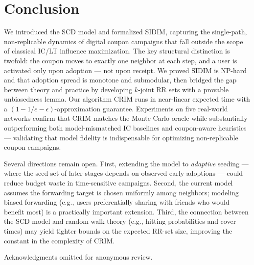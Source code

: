 \documentclass[sigconf]{acmart}
\newcommand{\CRIM}{\textsc{CRIM}}
\begin{document}


\section{Conclusion}
\label{sec:conclusion}

We introduced the SCD model and formalized SIDIM, capturing the
single-path, non-replicable dynamics of digital coupon campaigns that
fall outside the scope of classical IC/LT influence maximization.
The key structural distinction is twofold: the coupon moves to exactly
one neighbor at each step, and a user is activated only upon adoption
— not upon receipt.
We proved SIDIM is NP-hard and that adoption spread is monotone and
submodular, then bridged the gap between theory and practice by
developing $k$-joint RR sets with a provable unbiasedness lemma.
Our algorithm \CRIM{} runs in near-linear expected time with a
$(1{-}1/e{-}\epsilon)$-approximation guarantee.
Experiments on five real-world networks confirm that \CRIM{} matches
the Monte Carlo oracle while substantially outperforming both
model-mismatched IC baselines and coupon-aware heuristics — validating
that model fidelity is indispensable for optimizing non-replicable
coupon campaigns.

Several directions remain open.
First, extending the model to \emph{adaptive} seeding — where the
seed set of later stages depends on observed early adoptions — could
reduce budget waste in time-sensitive campaigns.
Second, the current model assumes the forwarding target is chosen
uniformly among neighbors; modeling biased forwarding
(e.g., users preferentially sharing with friends who would benefit
most) is a practically important extension.
Third, the connection between the SCD model and random walk theory
(e.g., hitting probabilities and cover times) may yield tighter bounds
on the expected RR-set size, improving the constant in the complexity
of \CRIM{}.

\begin{acks}
Acknowledgments omitted for anonymous review.
\end{acks}



\end{document}
